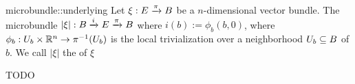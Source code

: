\begin{myexample}{microbundle::underlying}
    Let $\xi: E \xto{\pi} B$ be a $n$-dimensional vector bundle.
    The microbundle $\lvert \xi \rvert: \bundle{B}{E}{i}{\pi}$ where $i(b) := \phi_b(b, 0)$, where
    $\phi_b: U_b \times \R^n \to \pi^{-1}(U_b)$ is the local trivialization over a
    neighborhood $U_b \sub B$ of $b$. We call $\lvert \xi \rvert$ the  of $\xi$
    \begin{myproof}
        TODO
    \end{myproof}
\end{myexample}
